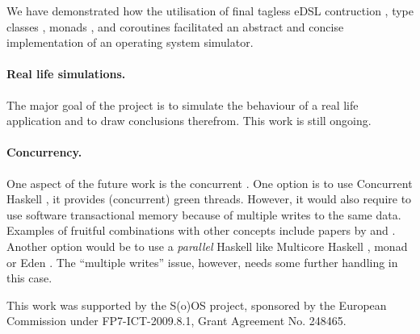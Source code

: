 We have demonstrated how the utilisation of final tagless eDSL contruction \cite{final_tagless_embedding}, type classes \cite{Hall:1996:TCH:227699.227700}, monads \cite{haskell-report} , and coroutines \cite{coroutines} facilitated an abstract and concise implementation of an operating system simulator.

\paragraph{Real life simulations.}
The major goal of the project is to simulate the behaviour of a real life application and to draw conclusions therefrom.
This work is still ongoing.

\paragraph{Concurrency.}
One aspect of the future work is the concurrent \soosim.
One option is to use Concurrent Haskell \cite{ConcHs}, it provides (concurrent) green threads.
However, it would also require to use software transactional memory \cite{springerlink:10.1007/s004460050028} because of multiple writes to the same data.
Examples of fruitful combinations with other concepts include papers by \citeauthor{Harris:2008:CMT:1378704.1378725} \cite{Harris:2008:CMT:1378704.1378725} and \citeauthor{Bieniusa:2010:BAA:1835698.1835714} \cite{Bieniusa:2010:BAA:1835698.1835714,springerlink:10.1007/978-3-642-25959-3_2}.
Another option would be to use a \emph{parallel} Haskell like Multicore Haskell \cite{marlow:rsm},  monad \cite{par-monad} or Eden \cite{eden}.
The ``multiple writes'' issue, however, needs some further handling in this case.

%

\acks

This work was supported by the S(o)OS project, sponsored by the European Commission under FP7-ICT-2009.8.1, Grant Agreement No. 248465.

